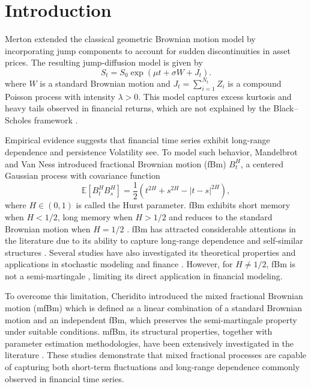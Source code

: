 \documentclass[a4paper,11pt]{amsart}
\theoremstyle{definition}
\theoremstyle{plain}
\theoremstyle{remark}
\newcommand{\1}{\mathbf{1}}
\begin{document}
\section{Introduction}

Merton \cite{merton1976option} extended the classical geometric Brownian motion model by incorporating jump components to account for sudden discontinuities in asset prices. The resulting jump-diffusion model is given by
\begin{equation}
\label{eq:1}
S_t = S_0 \exp\left(\mu t +\sigma W + J_t\right).
\end{equation}
where $W$ is a standard Brownian motion and $J_t = \sum_{i=1}^{N_t} Z_i$ is a compound Poisson process with intensity $\lambda > 0$. This model captures excess kurtosis and heavy tails observed in financial returns, which are not explained by the Black--Scholes framework \cite{Merton1976}.

Empirical evidence suggests that financial time series exhibit long-range dependence and persistence Volatility see\cite{longmemory2002,sadique2001}. To model such behavior, Mandelbrot and Van Ness \cite{Mandelbrot1968} introduced fractional Brownian motion (fBm) $B_t^H$, a centered Gaussian process with covariance function
\begin{equation}
\label{eq:2}
\mathbb{E}[B_t^H B_s^H] = \frac{1}{2}\left(t^{2H} + s^{2H} - |t-s|^{2H}\right),
\end{equation}
where $H \in (0,1)$ is called the Hurst parameter. fBm exhibits short memory when $H < 1/2$, long memory when $H >1/2$ and reduces to the standard Brownian motion when $H = 1/2$ \cite{Mandelbrot1968}. fBm has attracted considerable attentions in the literature due to its ability to capture long-range dependence and self-similar structures \cite{Franzke2020, Beran1994,Samorodnitsky2006}. Several studies have also investigated its theoretical properties and applications in stochastic modeling and finance \cite{hu2003,duncan2000,mishura2008}. However, for $H \neq 1/2$, fBm is not a semi-martingale \cite{sottinen2001}, limiting its direct application in financial modeling.

To overcome this limitation, Cheridito \cite{Cheridito2001} introduced the mixed fractional Brownian motion (mfBm) which is defined as a linear combination of a standard Brownian motion and an independent fBm, which preserves the semi-martingale property under suitable conditions. mfBm, its structural properties, together with parameter estimation methodologies, have been extensively investigated in the literature \cite{hu2011,xiao2015,masnita2010,xiao2011,sun2018,Beran1994,fay2009,palma2007}. These studies demonstrate that mixed fractional processes are capable of capturing both short-term fluctuations and long-range dependence commonly observed in financial time series.
\end{document}
